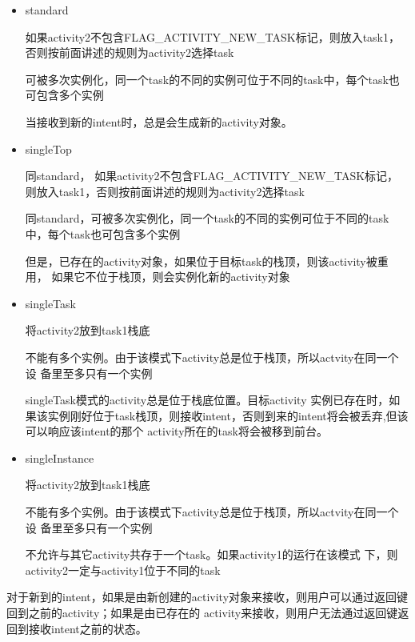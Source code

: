 \documentclass[a4paper, 11pt]{article}
\begin{document}
\littlehb
\begin{multicols}{2}
\begin{itemize}
    \item standard

如果activity2不包含FLAG_ACTIVITY_NEW_TASK标记，则放入task1，否则按前面讲述的规则为activity2选择task

可被多次实例化，同一个task的不同的实例可位于不同的task中，每个task也可包含多个实例

当接收到新的intent时，总是会生成新的activity对象。

\item singleTop

同standard， 如果activity2不包含FLAG_ACTIVITY_NEW_TASK标记，则放入task1，否则按前面讲述的规则为activity2选择task

同standard，可被多次实例化，同一个task的不同的实例可位于不同的task中，每个task也可包含多个实例

但是，已存在的activity对象，如果位于目标task的栈顶，则该activity被重用， 如果它不位于栈顶，则会实例化新的activity对象
\end{itemize}
\end{multicols}
\littlehb
\begin{multicols}{2}
\begin{itemize}

\item singleTask

将activity2放到task1栈底

不能有多个实例。由于该模式下activity总是位于栈顶，所以actvity在同一个设 备里至多只有一个实例

singleTask模式的activity总是位于栈底位置。目标activity 实例已存在时，如果该实例刚好位于task栈顶，则接收intent，否则到来的intent将会被丢弃,但该可以响应该intent的那个 activity所在的task将会被移到前台。

\item singleInstance

将activity2放到task1栈底

不能有多个实例。由于该模式下activity总是位于栈顶，所以actvity在同一个设 备里至多只有一个实例

不允许与其它activity共存于一个task。如果activity1的运行在该模式 下，则activity2一定与activity1位于不同的task
\end{itemize}
\end{multicols}
\littlehb

对于新到的intent，如果是由新创建的activity对象来接收，则用户可以通过返回键回到之前的activity；如果是由已存在的 activity来接收，则用户无法通过返回键返回到接收intent之前的状态。
\end{document}

